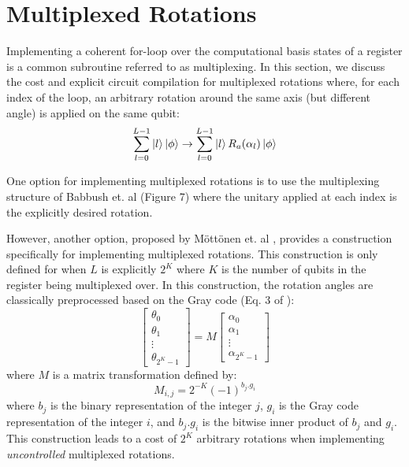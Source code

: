 \section{Multiplexed Rotations}
\label{sec:multiplexed-rotations}

Implementing a coherent for-loop over the computational basis states of a register is a common subroutine referred to as multiplexing.
In this section, we discuss the cost and explicit circuit compilation for multiplexed rotations where, for each index of the loop, an arbitrary rotation around the same axis (but different angle) is applied on the same qubit:
\begin{equation}
    \sum_{l=0}^{L - 1} \ket{l} \ket{\phi} \rightarrow \sum_{l=0}^{L - 1} \ket{l} R_a (\alpha_l) \ket{\phi}
\end{equation}

One option for implementing multiplexed rotations is to use the multiplexing structure of Babbush et. al \cite{babbush2018encoding} (Figure 7) where the unitary applied at each index is the explicitly desired rotation.

However, another option, proposed by Möttönen et. al \cite{mottonen2004transformation}, provides a construction specifically for implementing multiplexed rotations.
This construction is only defined for when $L$ is explicitly $2^K$ where $K$ is the number of qubits in the register being multiplexed over.
In this construction, the rotation angles are classically preprocessed based on the Gray code (Eq. 3 of \cite{mottonen2004transformation}):
\begin{equation}
    \begin{bmatrix}
        \theta_{0} \\
        \theta_{1} \\
        \vdots \\
        \theta_{2^K - 1}
    \end{bmatrix} = M \begin{bmatrix}
        \alpha_{0} \\
        \alpha_{1} \\
        \vdots \\
        \alpha_{2^K - 1}
    \end{bmatrix}
\end{equation}
where $M$ is a matrix transformation defined by:
\begin{equation}
    M_{i, j} = 2^{-K} (-1)^{b_{j} . g_{i}}
\end{equation}
where $b_j$ is the binary representation of the integer $j$, $g_i$ is the Gray code representation of the integer $i$, and $b_{j} . g_{i}$ is the bitwise inner product of $b_{j}$ and $g_{i}$.
This construction leads to a cost of $2^K$ arbitrary rotations when implementing \textit{uncontrolled} multiplexed rotations.

